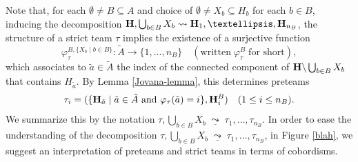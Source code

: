 \documentclass[11pt]{article}
\theoremstyle{definition}
\numberwithin{equation}{section}
\numberwithin{equation}{section}
\newcommand{\uline}[1]{\underline{#1}}
\newcommand{\set}[1]{\{#1\}}
\newcommand{\setc}[2]{\set{#1 \mid #2}}
\newcommand{\Union}{\bigcup}		%
\newcommand{\hyper}[1]{{\bf #1}}
\newcommand{\clandec}{\;\uline{\leadsto}\;}
\begin{document}
Note that, for each $\emptyset\neq B\subseteq A$ and choice of $\emptyset\neq X_b\subseteq H_b$ for each $b\in B$,  inducing the decomposition $\hyper{H}, \bigcup_{b\in B}X_b\leadsto \hyper{H}_1, \ldots, \hyper{H}_{n_B}$,
  the structure of a strict team $\tau$ implies the existence of a surjective function 
$$\varphi^{B,\setc{X_b}{b\in B}}_{\tau}:\tilde{A}\rightarrow \{1,\dots,n_B\} \quad(\mbox{written}\; \varphi^{B}_{\tau}\;\mbox{for short}),$$  which associates to  $\tilde{a}\in \tilde{A}$ the  index   of the connected component  of ${\bf H}\backslash \bigcup_{b\in B}X_b$ that contains $H_{\tilde{a}}$.  By Lemma \ref{Jovana-lemma}, this determines  preteams $$\tau_i =(\setc{\hyper{H}_{\tilde{a}}}{\tilde{a}\in \tilde{A} \mbox{ and } \varphi_{\tau}(\tilde{a})=i},\hyper{H}^B_i) \quad (1\leq i\leq n_B).$$ 
We summarize this by the notation $\tau,\Union_{b\in B}X_b\clandec \tau_1,\ldots,\tau_{n_B}$.  In order to ease the understanding of the decomposition $\tau,\Union_{b\in B}X_b\clandec \tau_1,\ldots,\tau_{n_B}$,   in Figure \ref{blah}, we suggest an interpretation of preteams and strict teams in terms of cobordisms. 
\end{document}
